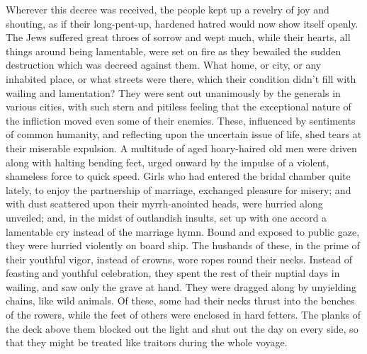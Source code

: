  Wherever this decree was received, the people kept up a
revelry of joy and shouting, as if their long-pent-up, hardened hatred
would now show itself openly.  The Jews suffered great
throes of sorrow and wept much, while their hearts, all things around
being lamentable, were set on fire as they bewailed the sudden
destruction which was decreed against them.  What home, or
city, or any inhabited place, or what streets were there, which their
condition didn't fill with wailing and lamentation?  They
were sent out unanimously by the generals in various cities, with such
stern and pitiless feeling that the exceptional nature of the infliction
moved even some of their enemies. These, influenced by sentiments of
common humanity, and reflecting upon the uncertain issue of life, shed
tears at their miserable expulsion.  A multitude of aged
hoary-haired old men were driven along with halting bending feet, urged
onward by the impulse of a violent, shameless force to quick speed.
 Girls who had entered the bridal chamber quite lately, to
enjoy the partnership of marriage, exchanged pleasure for misery; and
with dust scattered upon their myrrh-anointed heads, were hurried along
unveiled; and, in the midst of outlandish insults, set up with one
accord a lamentable cry instead of the marriage hymn.  Bound
and exposed to public gaze, they were hurried violently on board ship.
 The husbands of these, in the prime of their youthful
vigor, instead of crowns, wore ropes round their necks. Instead of
feasting and youthful celebration, they spent the rest of their nuptial
days in wailing, and saw only the grave at hand.  They were
dragged along by unyielding chains, like wild animals. Of these, some
had their necks thrust into the benches of the rowers, while the feet of
others were enclosed in hard fetters.  The planks of the
deck above them blocked out the light and shut out the day on every
side, so that they might be treated like traitors during the whole
voyage.

